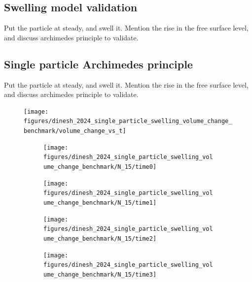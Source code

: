 \documentclass[preprint,12pt]{elsarticle}
\begin{document}
\subsection*{Swelling model validation}

Put the particle at steady, and swell it. Mention the rise in the free surface
level, and discuss archimedes principle to validate.


\subsection*{Single particle Archimedes principle}

Put the particle at steady, and swell it. Mention the rise in the free surface
level, and discuss archimedes principle to validate.

\begin{figure}[!htpb]
  \centering
    \texttt{[image: figures/dinesh\_2024\_single\_particle\_swelling\_volume\_change\_benchmark/volume\_change\_vs\_t]}
  \caption{}
\label{fig:}
\end{figure}

\begin{figure}[!htpb]
  \centering
  \begin{subfigure}{0.48\textwidth}
    \centering
    \texttt{[image: figures/dinesh\_2024\_single\_particle\_swelling\_volume\_change\_benchmark/N\_15/time0]}
    \label{fig:1-mixing-1-a}
  \end{subfigure}
  \begin{subfigure}{0.48\textwidth}
    \centering
    \texttt{[image: figures/dinesh\_2024\_single\_particle\_swelling\_volume\_change\_benchmark/N\_15/time1]}
    \label{fig:1-mixing-1-b}
  \end{subfigure}

  \begin{subfigure}{0.48\textwidth}
    \centering
    \texttt{[image: figures/dinesh\_2024\_single\_particle\_swelling\_volume\_change\_benchmark/N\_15/time2]}
    \label{fig:1-mixing-1-c}
  \end{subfigure}
  \begin{subfigure}{0.48\textwidth}
    \centering
    \texttt{[image: figures/dinesh\_2024\_single\_particle\_swelling\_volume\_change\_benchmark/N\_15/time3]}
    \label{fig:1-mixing-1-c}
  \end{subfigure}
  \caption{}
\label{fig:xxxx}
\end{figure}
\end{document}
